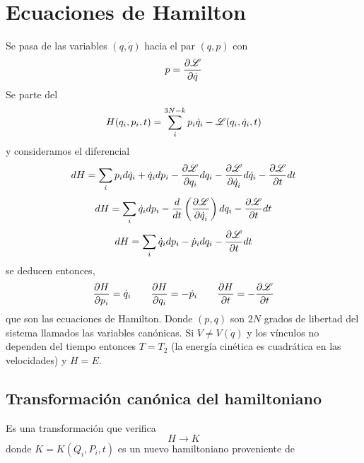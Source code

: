 \documentclass[10pt,oneside]{CBFT_book}
\begin{document}
\chapter{Ecuaciones de Hamilton}

Se pasa de las variables $(q, \dot{q})$ hacia el par $(q,p)$ con 
\[
	p = \dpar{\Lag}{\dot{q}}
\]
Se parte del 
\[
	H(q_i, p_i, t) = \sum_{i}^{3N-k} p_i \dot{q}_i - \Lag(q_i, \dot{q}_i, t)
\]
y consideramos el diferencial
\[
	dH = \sum_i p_i d\dot{q}_i + \dot{q}_i dp_i - \dpar{\Lag}{q_i} dq_i - \dpar{\Lag}{\dot{q}_i}d\dot{q}_i - \dpar{\Lag}{t}dt
\]
\[
	dH = \sum_i \dot{q}_i dp_i - \frac{d}{dt}\left( \dpar{\Lag}{\dot{q}_i} \right) dq_i - \dpar{\Lag}{t}dt
\]
\[
	dH = \sum_i \dot{q}_i dp_i - \dot{p}_i dq_i - \dpar{\Lag}{t}dt
\]
se deducen entonces,
\[
	\dpar{H}{p_i} = \dot{q}_i \qquad \dpar{H}{q_i} = -\dot{p}_i \qquad \dpar{H}{t} = -\dpar{\Lag}{t}
\]
que son las ecuaciones de Hamilton. Donde $(p,q)$ son $2N$ grados de libertad del sistema llamados las variables canónicas.
Si $V\neq V(\dot{q})$ y los vínculos no dependen del tiempo entonces $T=T_2$ (la energía cinética es cuadrática en las 
velocidades) y $H=E$.

\section{Transformación canónica del hamiltoniano}

Es una transformación que verifica
\[
	H \longrightarrow K
\]
donde $K=K(Q_i,P_i,t)$ es un nuevo hamiltoniano proveniente de


\end{document}
